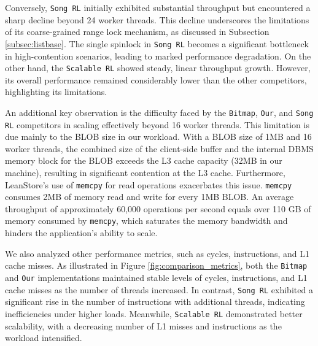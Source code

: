 Conversely, \texttt{Song RL} initially exhibited substantial throughput but encountered a sharp decline beyond 24 worker threads. 
This decline underscores the limitations of its coarse-grained range lock mechanism, as discussed in Subsection \ref{subsec:listbase}. 
The single spinlock in \texttt{Song RL} becomes a significant bottleneck in high-contention scenarios, leading to marked performance degradation. 
On the other hand, the \texttt{Scalable RL} showed steady, linear throughput growth. 
However, its overall performance remained considerably lower than the other competitors, highlighting its limitations.

An additional key observation is the difficulty faced by the \texttt{Bitmap}, \texttt{Our}, and \texttt{Song RL} competitors in scaling effectively beyond 16 worker threads. 
This limitation is due mainly to the BLOB size in our workload. With a BLOB size of 1MB and 16 worker threads, the combined size of the client-side buffer and the internal DBMS memory block for the BLOB exceeds the L3 cache capacity (32MB in our machine), resulting in significant contention at the L3 cache. 
Furthermore, LeanStore's use of \texttt{memcpy} for read operations exacerbates this issue. \texttt{memcpy} consumes 2MB of memory read and write for every 1MB BLOB. 
An average throughput of approximately 60,000 operations per second equals over 110 GB of memory consumed by \texttt{memcpy}, which saturates the memory bandwidth and hinders the application's ability to scale.

We also analyzed other performance metrics, such as cycles, instructions, and L1 cache misses. 
As illustrated in Figure \ref{fig:comparison_metrics}, both the \texttt{Bitmap} and \texttt{Our} implementations maintained stable levels of cycles, instructions, and L1 cache misses as the number of threads increased. 
In contrast, \texttt{Song RL} exhibited a significant rise in the number of instructions with additional threads, indicating inefficiencies under higher loads. 
Meanwhile, \texttt{Scalable RL} demonstrated better scalability, with a decreasing number of L1 misses and instructions as the workload intensified.

